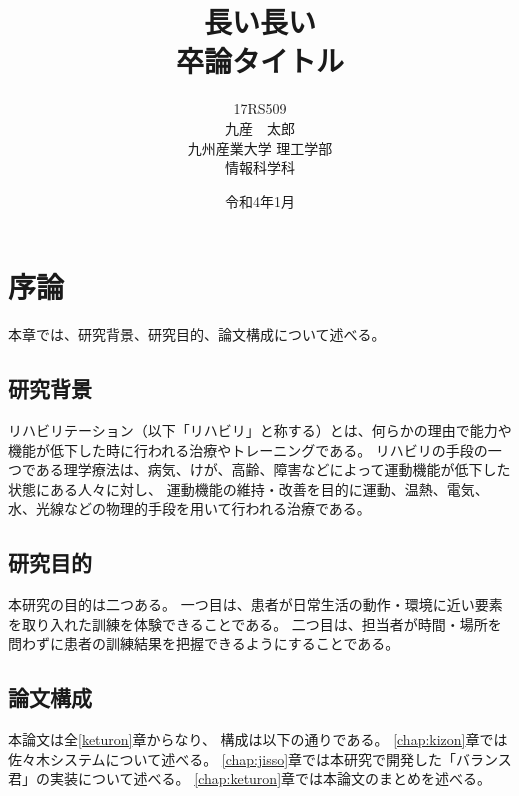 \documentclass[a4j,12pt,onecolumn,oneside,titlepage,openany,final]{jreport}
\title{
 \Huge{長い長い}\\
 \Huge{卒論タイトル}
 \vspace{5.5cm}\\
}
\author{\LARGE{17RS509}\vspace{0.5cm}\\
\LARGE{九産　太郎}\vspace{2cm}\\
\LARGE{九州産業大学 理工学部}\vspace{0.5cm}\\
\LARGE{情報科学科}\vspace{1cm}\\
}
\date{\LARGE{令和4年1月}}
\begin{document}
\maketitle
\tableofcontents
\listoffigures
\listoftables




\chapter{序論}\label{chap:joron}
本章では、研究背景、研究目的、論文構成について述べる。

\section{研究背景}\label{sec:haikei}

リハビリテーション（以下「リハビリ」と称する）とは、何らかの理由で能力や機能が低下した時に行われる治療やトレーニングである。
リハビリの手段の一つである理学療法は、病気、けが、高齢、障害などによって運動機能が低下した状態にある人々に対し、
運動機能の維持・改善を目的に運動、温熱、電気、水、光線などの物理的手段を用いて行われる治療である\cite{igaku}。
  
    
\section{研究目的}\label{sec:mokuteki}

本研究の目的は二つある。
一つ目は、患者が日常生活の動作・環境に近い要素を取り入れた訓練を体験できることである。
二つ目は、担当者が時間・場所を問わずに患者の訓練結果を把握できるようにすることである。

  
\section{論文構成}\label{sec:kousei}

本論文は全\ref{keturon}章からなり、
構成は以下の通りである。
\ref{chap:kizon}章では佐々木システムについて述べる。
\ref{chap:jisso}章では本研究で開発した「バランス君」の実装について述べる。
\ref{chap:keturon}章では本論文のまとめを述べる。

\end{document}
